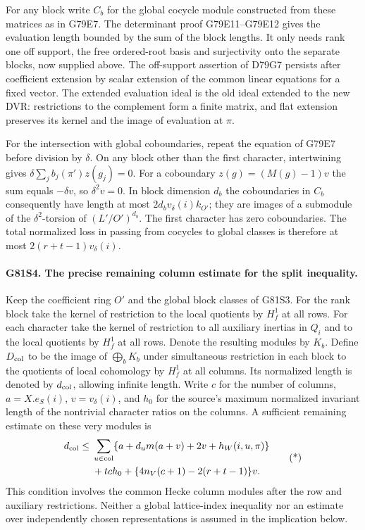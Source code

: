 For any block write $C_b$ for the global cocycle module constructed
from these matrices as in G79E7. The determinant proof
G79E11--G79E12 gives the evaluation length bounded by the sum
of the block lengths. It only needs rank one off support, the
free ordered-root basis and surjectivity onto the separate blocks,
now supplied above. The off-support assertion of D79G7 persists
after coefficient extension by scalar extension of the common
linear equations for a fixed vector. The extended evaluation
ideal is the old ideal extended to the new DVR: restrictions
to the complement form a finite matrix, and flat extension
preserves its kernel and the image of evaluation at $\pi$.

For the intersection with global coboundaries, repeat the equation
of G79E7 before division by $\delta$. On any block other than the
first character, intertwining gives
$\delta\sum_j b_j(\pi')z(g_j)=0$. For a coboundary
$z(g)=(M(g)-1)v$ the sum equals $-\delta v$, so $\delta^2 v=0$.
In block dimension $d_b$ the coboundaries in $C_b$ consequently
have length at most $2d_b v_\delta(i)k_{O'}$; they are images of
a submodule of the $\delta^2$-torsion of $(L'/O')^{d_b}$.
The first character has zero coboundaries. The total normalized
loss in passing from cocycles to global classes is therefore at
most $2(r+t-1)v_\delta(i)$.

\paragraph{G81S4. The precise remaining column estimate for the split inequality.}
Keep the coefficient ring $O'$ and the global block classes of
G81S3. For the rank block take the kernel of restriction to the
local quotients by $H_f^1$ at all rows. For each character take
the kernel of restriction to all auxiliary inertias in $Q_i$
and to the local quotients by $H_f^1$ at all rows. Denote the
resulting modules by $K_b$. Define $D_{\rm col}$ to be the
image of $\bigoplus_b K_b$ under simultaneous restriction in
each block to the quotients of local cohomology by $H_f^1$ at
all columns. Its normalized length is denoted by $d_{\rm col}$,
allowing infinite length. Write $c$ for the number of columns,
$a=X.e_S(i)$, $v=v_\delta(i)$, and $h_0$ for the source's maximum
normalized invariant length of the nontrivial character ratios
on the columns. A sufficient remaining estimate on these very
modules is
\[
\begin{split}
 d_{\rm col}\le{}&
 \sum_{u\in\mathrm{col}}
        \{a+d_um(a+v)+2v+h_W(i,u,\pi)\}\\
 &+tc h_0+\{4n_V(c+1)-2(r+t-1)\}v .
\end{split}                                                     \tag{*}
\]
This condition involves the common Hecke column modules after the
row and auxiliary restrictions. Neither a global lattice-index
inequality nor an estimate over independently chosen representations
is assumed in the implication below.

